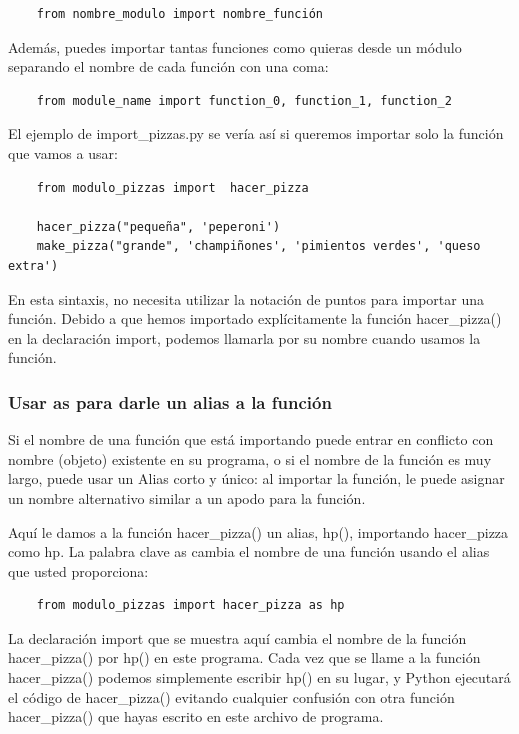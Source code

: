\begin{lstlisting}
	from nombre_modulo import nombre_función
\end{lstlisting}

Además, puedes importar tantas funciones como quieras desde un módulo separando
el nombre de cada función con una coma:

\begin{lstlisting}
	from module_name import function_0, function_1, function_2
\end{lstlisting}

El ejemplo de {\ttfamily import\_pizzas.py} se vería así si queremos importar
solo la función que vamos a usar:

\begin{lstlisting}
	from modulo_pizzas import  hacer_pizza
	
	hacer_pizza("pequeña", 'peperoni')
	make_pizza("grande", 'champiñones', 'pimientos verdes', 'queso extra')
\end{lstlisting}

En esta sintaxis, no necesita utilizar la notación de puntos para importar una
función. Debido a que hemos importado explícitamente la función {\ttfamily hacer\_pizza()}  en la
declaración  {\ttfamily import}, podemos llamarla por su nombre cuando usamos la función.

\subsubsection{Usar {\ttfamily as} para darle un alias a la función}

Si el nombre de una función que está importando puede entrar en conflicto con nombre (objeto) existente
en su programa, o si el nombre de la función es muy largo, puede usar un Alias corto y único: al importar la función, le puede asignar un nombre alternativo similar a un apodo para la función. 

Aquí le damos a la función {\ttfamily hacer\_pizza()} un alias, {\ttfamily hp()}, importando  {\ttfamily hacer\_pizza} como {\ttfamily hp}. La palabra clave {\ttfamily as} cambia el nombre de una función usando el alias que usted proporciona:

\begin{lstlisting}
	from modulo_pizzas import hacer_pizza as hp
\end{lstlisting}

La declaración {\ttfamily import} que se muestra aquí cambia el nombre de la función  {\ttfamily hacer\_pizza()}  por {\ttfamily hp()} en este programa. Cada vez que se llame  a la función {\ttfamily hacer\_pizza()} podemos simplemente escribir {\ttfamily hp()} en su lugar, y Python ejecutará el código de {\ttfamily hacer\_pizza()} evitando cualquier confusión con otra función {\ttfamily hacer\_pizza()} que hayas escrito en este archivo de programa.

